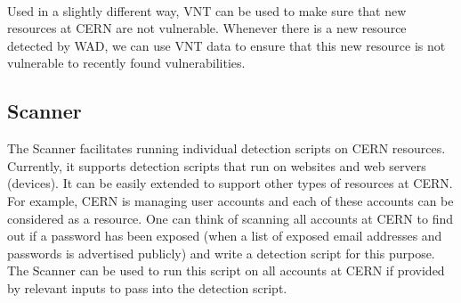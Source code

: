 \paragraph{}
Used in a slightly different way, VNT can be used to make sure that new resources at CERN are not vulnerable. Whenever there is a new resource detected by WAD, we can use VNT data to ensure that this new resource is not vulnerable to recently found vulnerabilities.
\subsection{Scanner}
The Scanner facilitates running individual detection scripts on CERN resources. Currently, it supports detection scripts that run on websites and web servers (devices). It can be easily extended to support other types of resources at CERN. For example, CERN is managing user accounts and each of these accounts can be considered as a resource. One can think of scanning all accounts at CERN to find out if 
a password has been exposed (when a list of exposed email addresses and passwords is advertised publicly) and write a detection script for this purpose. The Scanner can be used to run this script on all accounts at CERN if provided by relevant inputs to pass into the detection script.
\\